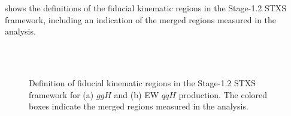  shows the definitions of the fiducial kinematic regions in the Stage-1.2 STXS framework, including an indication of the merged regions measured in the \HWW analysis. 

\begin{figure}[h]
    \centering
     \\
     \\
    {\caption{Definition of fiducial kinematic regions in the Stage-1.2 STXS framework for (a) $ggH$ and (b) EW $qqH$ production. The colored boxes indicate the merged regions measured in the \HWW analysis.
            \label{fig:stxs:stage-12-definition} }}
\end{figure}










